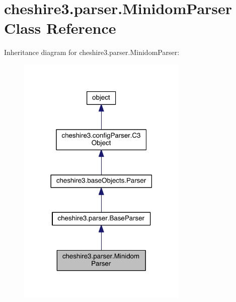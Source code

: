 \hypertarget{classcheshire3_1_1parser_1_1_minidom_parser}{\section{cheshire3.\-parser.\-Minidom\-Parser Class Reference}
\label{classcheshire3_1_1parser_1_1_minidom_parser}
}


Inheritance diagram for cheshire3.\-parser.\-Minidom\-Parser\-:
\nopagebreak
\begin{figure}[H]
\begin{center}
\leavevmode
\includegraphics[width=230pt]{classcheshire3_1_1parser_1_1_minidom_parser__inherit__graph}
\end{center}
\end{figure}



